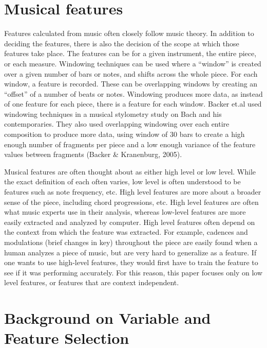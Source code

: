 \documentclass[12pt,twoside]{reedthesis}
\theoremstyle{definition}
\theoremstyle{definition}
\theoremstyle{definition}
\theoremstyle{remark}
\begin{document}
\section{Musical features}\label{musical-features}

Features calculated from music often closely follow music theory. In
addition to deciding the features, there is also the decision of the
scope at which those features take place. The features can be for a
given instrument, the entire piece, or each measure. Windowing
techniques can be used where a ``window'' is created over a given number
of bars or notes, and shifts across the whole piece. For each window, a
feature is recorded. These can be overlapping windows by creating an
``offset'' of a number of beats or notes. Windowing produces more data,
as instead of one feature for each piece, there is a feature for each
window. Backer et.al used windowing techniques in a musical stylometry
study on Bach and his contemporaries. They also used overlapping
windowing over each entire composition to produce more data, using
window of 30 bars to create a high enough number of fragments per piece
and a low enough variance of the feature values between fragments
(Backer \& Kranenburg, 2005).

Musical features are often thought about as either high level or low
level. While the exact definition of each often varies, low level is
often understood to be features such as note frequency, etc. High level
features are more about a broader sense of the piece, including chord
progressions, etc. High level features are often what music experts use
in their analysis, whereas low-level features are more easily extracted
and analyzed by computer. High level features often depend on the
context from which the feature was extracted. For example, cadences and
modulations (brief changes in key) throughout the piece are easily found
when a human analyzes a piece of music, but are very hard to generalize
as a feature. If one wants to use high-level features, they would first
have to train the feature to see if it was performing accurately. For
this reason, this paper focuses only on low level features, or features
that are context independent.

\section{Background on Variable and Feature
Selection}\label{background-on-variable-and-feature-selection}
\end{document}

